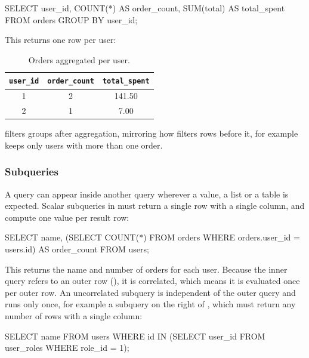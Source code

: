 \begin{sqlblock}
SELECT user_id, COUNT(*) AS order_count, SUM(total) AS total_spent
FROM orders
GROUP BY user_id;
\end{sqlblock}

This returns one row per user:

\begin{table}[H]
	\centering
	\begin{tabular}{|c|c|c|}
		\hline
		\texttt{user\_id} & \texttt{order\_count} & \texttt{total\_spent} \\
		\hline
		1                 & 2                     & 141.50                \\
		2                 & 1                     & 7.00                  \\
		\hline
	\end{tabular}
	\caption{Orders aggregated per user.}
	\label{tab:order-totals}
\end{table}

 filters groups after aggregation,
mirroring how  filters rows before it,
for example  keeps only users with more than one order.

\subsubsection{Subqueries}

A query can appear inside another query wherever a value, a list or a table is expected.
Scalar subqueries in  must return a single row with a single column,
and compute one value per result row:

\begin{sqlblock}
SELECT name,
       (SELECT COUNT(*) FROM orders WHERE orders.user_id = users.id) AS order_count
FROM users;
\end{sqlblock}

This returns the name and number of orders for each user.
Because the inner query refers to an outer row (),
it is correlated, which means it is evaluated once per outer row.
An uncorrelated subquery is independent of the outer query and runs only once,
for example a subquery on the right of ,
which must return any number of rows with a single column:

\begin{sqlblock}
SELECT name FROM users
WHERE id IN (SELECT user_id FROM user_roles WHERE role_id = 1);
\end{sqlblock}

